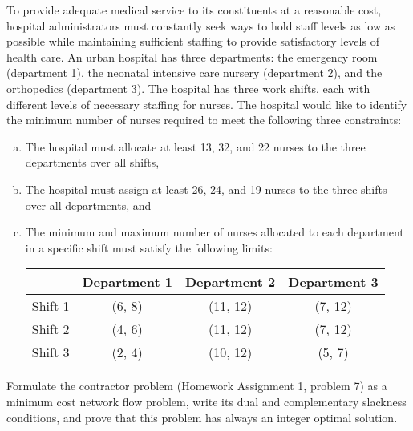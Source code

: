 \documentclass[fleqn]{homework}
\begin{document}
  \maketitle

  \begin{problem}{6}
    \begin{question}
      To provide adequate medical service to its constituents at a reasonable
      cost, hospital administrators must constantly seek ways to hold staﬀ
      levels as low as possible while maintaining suﬃcient staﬃng to provide
      satisfactory levels of health care.  An urban hospital has three
      departments: the emergency room (department 1), the neonatal intensive
      care nursery (department 2), and the orthopedics (department 3). The
      hospital has three work shifts, each with diﬀerent levels of necessary
      staﬃng for nurses. The hospital would like to identify the minimum number
      of nurses required to meet the following three constraints: 

      \begin{enumerate}[a.]
      \item The hospital must allocate at least 13, 32, and 22 nurses to the
        three departments over all shifts,
      \item The hospital must assign at least 26, 24, and 19 nurses to the three
        shifts over all departments, and
      \item The minimum and maximum number of nurses allocated to each
        department in a speciﬁc shift must satisfy the following limits:

        \begin{tabular}{|l|ccc|}
          \hline
          & Department 1 & Department 2 & Department 3 \\
          \hline
          Shift 1 & (6, 8) & (11, 12) & (7, 12) \\
          Shift 2 & (4, 6) & (11, 12) & (7, 12) \\
          Shift 3 & (2, 4) & (10, 12) & (5, 7) \\
          \hline
        \end{tabular}
      \end{enumerate}
    \end{question}
  \end{problem}

  \begin{problem}{8}
    \begin{question}
      Formulate the contractor problem (Homework Assignment 1, problem 7) as a
      minimum cost network ﬂow problem, write its dual and complementary
      slackness conditions, and prove that this problem has always an integer
      optimal solution.
    \end{question}
  \end{problem}
\end{document}
